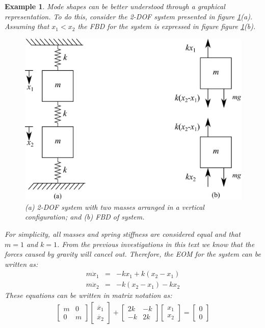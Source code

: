 \documentclass[12pt,letter]{article}
\newtheorem{ex}{Example}
\numberwithin{ex}{section} %
\newenvironment{example}{\begin{mdframed}[middlelinewidth=0.5mm]\begin{ex}\normalfont}{\end{ex}\end{mdframed}}
\numberwithin{re}{section} %
\begin{document}
\begin{example}
Mode shapes can be better understood through a graphical representation. To do this, consider the 2-DOF system presented in figure \ref{fig:2-DOF-spring_mass_vertical}(a). Assuming that $x_1<x_2$ the FBD for the system is expressed in figure figure \ref{fig:2-DOF-spring_mass_vertical}(b).

\begin{figure}[H]
	\centering
	\includegraphics[]{../Figures/2-DOF-spring_mass_vertical_with_FBD.png}
	\caption{(a) 2-DOF system with two masses arranged in a vertical configuration; and (b) FBD of system.}
	\label{fig:2-DOF-spring_mass_vertical}
\end{figure}
\noindent For simplicity, all masses and spring stiffness are considered equal and that $m=1$ and $k=1$. From the previous investigations in this text we know that the forces caused by gravity will cancel out. Therefore, the EOM for the system can be written as:
\begin{eqnarray}
m\ddot{x}_1 &= & -kx_1 + k(x_2-x_1) \\
m\ddot{x}_2&= & -k(x_2-x_1) -kx_2 \nonumber
\end{eqnarray}
These equations can be written in matrix notation as:
\begin{eqnarray}
	\begin{bmatrix} m & 0  \\  0 & m \end{bmatrix}\begin{bmatrix} \ddot{x_1} \\  \ddot{x_2} \end{bmatrix} + \begin{bmatrix} 2k & -k  \\  -k & 2k \end{bmatrix}\begin{bmatrix} x_1 \\  x_2 \end{bmatrix} = \begin{bmatrix} 0 \\  0 \end{bmatrix}

\end{eqnarray}
\end{example}
\end{document}
